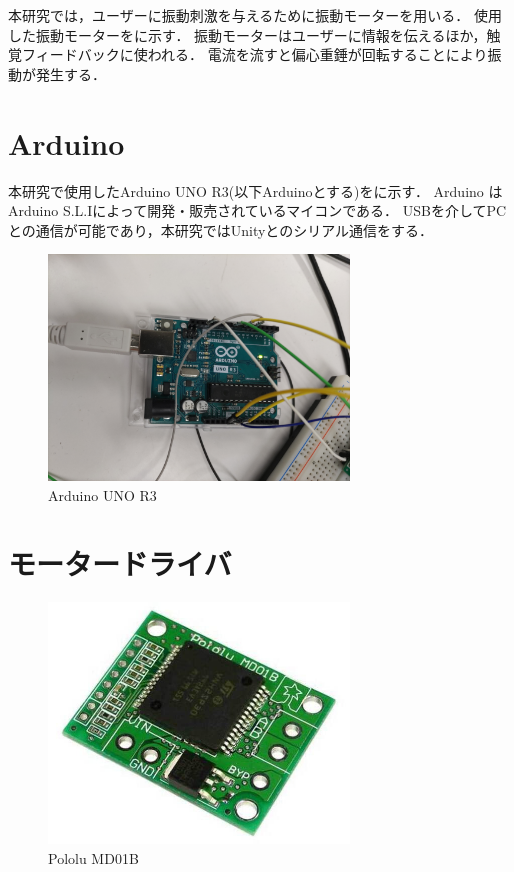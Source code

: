 本研究では，ユーザーに振動刺激を与えるために振動モーターを用いる．
使用した振動モーターをに示す．
振動モーターはユーザーに情報を伝えるほか，触覚フィードバックに使われる．
電流を流すと偏心重錘が回転することにより振動が発生する．


\section{Arduino}
本研究で使用したArduino UNO R3\cite{arduino}(以下Arduinoとする)をに示す．
Arduino はArduino S.L.Iによって開発・販売されているマイコンである．
USBを介してPCとの通信が可能であり，本研究ではUnityとのシリアル通信をする．

\begin{figure}[h]
\centering
\includegraphics[clip,width=8cm]{./fig/Arduino.png}
\caption{Arduino UNO R3}\label{arduino}
\end{figure}

\newpage

\section{モータードライバ}

\begin{figure}[h]
\centering
\includegraphics[clip,width=8cm]{./fig/pololuMD01B.png}
\caption{Pololu MD01B}\label{polo}
\end{figure}


